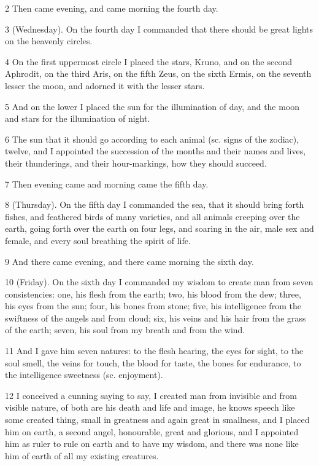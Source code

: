 \par 2 Then came evening, and came morning the fourth day.

\par 3 (Wednesday). On the fourth day I commanded that there should be great lights on the heavenly circles.

\par 4 On the first uppermost circle I placed the stars, Kruno, and on the second Aphrodit, on the third Aris, on the fifth Zeus, on the sixth Ermis, on the seventh lesser the moon, and adorned it with the lesser stars.

\par 5 And on the lower I placed the sun for the illumination of day, and the moon and stars for the illumination of night.

\par 6 The sun that it should go according to each animal (sc. signs of the zodiac), twelve, and I appointed the succession of the months and their names and lives, their thunderings, and their hour-markings, how they should succeed.

\par 7 Then evening came and morning came the fifth day.

\par 8 (Thursday). On the fifth day I commanded the sea, that it should bring forth fishes, and feathered birds of many varieties, and all animals creeping over the earth, going forth over the earth on four legs, and soaring in the air, male sex and female, and every soul breathing the spirit of life.

\par 9 And there came evening, and there came morning the sixth day.

\par 10 (Friday). On the sixth day I commanded my wisdom to create man from seven consistencies: one, his flesh from the earth; two, his blood from the dew; three, his eyes from the sun; four, his bones from stone; five, his intelligence from the swiftness of the angels and from cloud; six, his veins and his hair from the grass of the earth; seven, his soul from my breath and from the wind.

\par 11 And I gave him seven natures: to the flesh hearing, the eyes for sight, to the soul smell, the veins for touch, the blood for taste, the bones for endurance, to the intelligence sweetness (sc. enjoyment).

\par 12 I conceived a cunning saying to say, I created man from invisible and from visible nature, of both are his death and life and image, he knows speech like some created thing, small in greatness and again great in smallness, and I placed him on earth, a second angel, honourable, great and glorious, and I appointed him as ruler to rule on earth and to have my wisdom, and there was none like him of earth of all my existing creatures.

